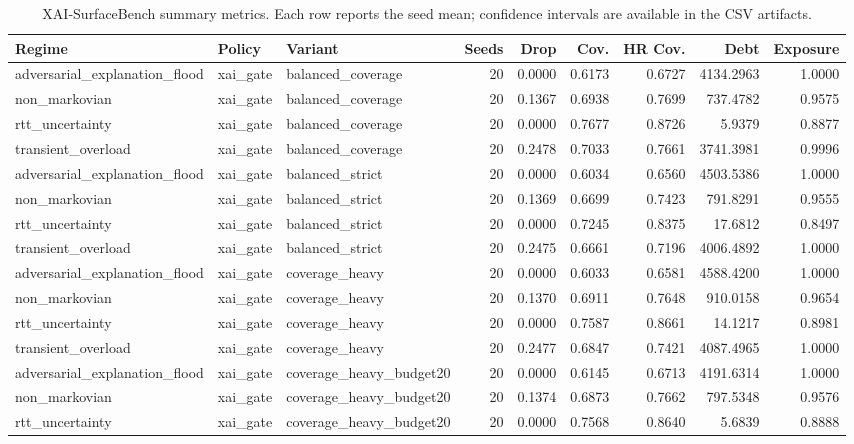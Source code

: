 \begin{table}[t]
\centering
\scriptsize
\caption{XAI-SurfaceBench summary metrics. Each row reports the seed mean; confidence intervals are available in the CSV artifacts.}
\begin{tabular}{lllrrrrrr}
\toprule
Regime & Policy & Variant & Seeds & Drop & Cov. & HR Cov. & Debt & Exposure \\
\midrule
adversarial\_explanation\_flood & xai\_gate & balanced\_coverage & 20 & 0.0000 & 0.6173 & 0.6727 & 4134.2963 & 1.0000 \\
non\_markovian & xai\_gate & balanced\_coverage & 20 & 0.1367 & 0.6938 & 0.7699 & 737.4782 & 0.9575 \\
rtt\_uncertainty & xai\_gate & balanced\_coverage & 20 & 0.0000 & 0.7677 & 0.8726 & 5.9379 & 0.8877 \\
transient\_overload & xai\_gate & balanced\_coverage & 20 & 0.2478 & 0.7033 & 0.7661 & 3741.3981 & 0.9996 \\
adversarial\_explanation\_flood & xai\_gate & balanced\_strict & 20 & 0.0000 & 0.6034 & 0.6560 & 4503.5386 & 1.0000 \\
non\_markovian & xai\_gate & balanced\_strict & 20 & 0.1369 & 0.6699 & 0.7423 & 791.8291 & 0.9555 \\
rtt\_uncertainty & xai\_gate & balanced\_strict & 20 & 0.0000 & 0.7245 & 0.8375 & 17.6812 & 0.8497 \\
transient\_overload & xai\_gate & balanced\_strict & 20 & 0.2475 & 0.6661 & 0.7196 & 4006.4892 & 1.0000 \\
adversarial\_explanation\_flood & xai\_gate & coverage\_heavy & 20 & 0.0000 & 0.6033 & 0.6581 & 4588.4200 & 1.0000 \\
non\_markovian & xai\_gate & coverage\_heavy & 20 & 0.1370 & 0.6911 & 0.7648 & 910.0158 & 0.9654 \\
rtt\_uncertainty & xai\_gate & coverage\_heavy & 20 & 0.0000 & 0.7587 & 0.8661 & 14.1217 & 0.8981 \\
transient\_overload & xai\_gate & coverage\_heavy & 20 & 0.2477 & 0.6847 & 0.7421 & 4087.4965 & 1.0000 \\
adversarial\_explanation\_flood & xai\_gate & coverage\_heavy\_budget20 & 20 & 0.0000 & 0.6145 & 0.6713 & 4191.6314 & 1.0000 \\
non\_markovian & xai\_gate & coverage\_heavy\_budget20 & 20 & 0.1374 & 0.6873 & 0.7662 & 797.5348 & 0.9576 \\
rtt\_uncertainty & xai\_gate & coverage\_heavy\_budget20 & 20 & 0.0000 & 0.7568 & 0.8640 & 5.6839 & 0.8888 \\

\end{tabular}
\end{table}
